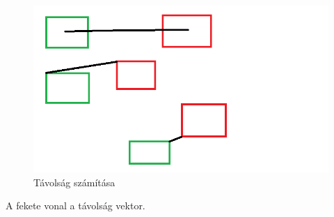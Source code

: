 \begin{figure}[htb]
\begin{center}
    \includegraphics[scale=0.5]{images/distance}
    \caption{Távolság számítása}
    \label{fig:distance}
\end{center}
\end{figure}

A fekete vonal a távolság vektor.

